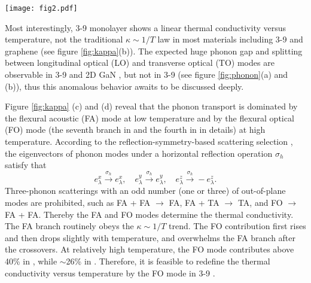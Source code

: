 \documentclass[journal=jpclcd,manuscript=article, layout=twocolumn]{achemso}
\begin{document}
	\begin{figure*}[t]
		\centering	
		\texttt{[image: fig2.pdf]}
		\caption{(a)-(d) Phonon spectra as well as density of states (DOS), and the scattering-rate distributions of the FO branch with the Born effective charges and the dielectric constants in the first Brillouin zone in 3-9  and . (e)-(g) The scattering rates and the heat capacity versus frequency at representative temperatures, and the maximum group velocity of each phonon branch in 3-9 .}
		\label{fig:phonon}
	\end{figure*}
	
	Most interestingly, 3-9  monolayer shows a linear thermal conductivity versus temperature, not the traditional $\kappa\sim1/T$ law in most materials including 3-9  and graphene (see figure \ref{fig:kappa}(b)). The expected huge phonon gap and splitting between longitudinal optical (LO) and transverse optical (TO) modes are observable in 3-9  and 2D GaN \cite{2017-PRB-GaN}, but not in 3-9  (see figure \ref{fig:phonon}(a) and (b)), thus this anomalous behavior awaits to be discussed deeply.
	

	Figure \ref{fig:kappa} (c) and (d) reveal that the phonon transport is dominated by the flexural acoustic (FA) mode at low temperature and by the flexural optical (FO) mode (the seventh branch in  and the fourth in  in details) at high temperature. According to the reflection-symmetry-based scattering selection \cite{2010-PRB-flexural-phonon,2019-nanoscale-reflection}, the eigenvectors of phonon modes under a horizontal reflection operation $\sigma_h$ satisfy that
	\begin{equation}
		e^{x}_{\lambda} \stackrel{\sigma_h}{\longrightarrow}e^{x}_{\lambda},\quad e^{y}_{\lambda} \stackrel{\sigma_h}{\longrightarrow}e^{y}_{\lambda}, \quad  e^{z}_{\lambda} \stackrel{\sigma_h}{\longrightarrow} - e^{z}_{\lambda}.
	\end{equation}
	Three-phonon scatterings with an odd number (one or three) of out-of-plane modes are prohibited, such as FA + FA $\to$ FA, FA + TA $\to$ TA, and FO $\to$ FA + FA.	Thereby the FA and FO modes determine the thermal conductivity. The FA branch routinely obeys the $\kappa\sim1/T$ trend. The FO contribution first rises and then drops slightly with temperature, and overwhelms the FA branch after the crossovers. At relatively high temperature, the FO mode contributes above 40\% in , while $\sim$26\% in . Therefore, it is feasible to redefine the thermal conductivity versus temperature by the FO mode in 3-9 .
\end{document}

